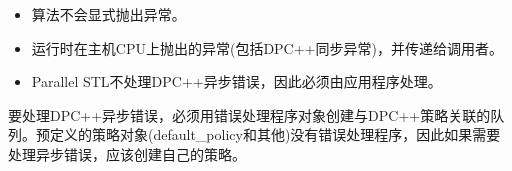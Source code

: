 \begin{itemize}
	\item 算法不会显式抛出异常。
	\item 运行时在主机CPU上抛出的异常(包括DPC++同步异常)，并传递给调用者。
	\item Parallel STL不处理DPC++异步错误，因此必须由应用程序处理。
\end{itemize}

要处理DPC++异步错误，必须用错误处理程序对象创建与DPC++策略关联的队列。预定义的策略对象(default\_policy和其他)没有错误处理程序，因此如果需要处理异步错误，应该创建自己的策略。\par

































